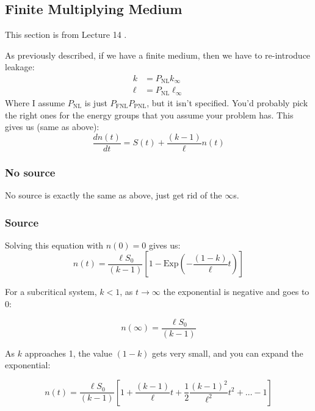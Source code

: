 \documentclass[letter]{article}
\begin{document}
\subsection{Finite Multiplying Medium}

This section is from Lecture 14 \cite{lecture}.

As previously described, if we have a finite medium, then we have to
re-introduce leakage:
\begin{equation*}
  \begin{split}
    k&=P_{\text{NL}}k_\infty \\
    \ell &= P_{\text{NL}}\ell_\infty
  \end{split}
\end{equation*}
Where I assume $P_{\text{NL}}$ is just $P_{\text{FNL}}P_{\text{PNL}}$,
but it isn't specified. You'd probably pick the right ones for the
energy groups that you assume your problem has. This gives us (same as
above):
\begin{equation*}
      \frac{dn(t)}{dt}=S(t)+\frac{(k-1)}{\ell}n(t)
\end{equation*}

\subsubsection{No source}

No source is exactly the same as above, just get rid of the $\infty$s.

\subsubsection{Source}

Solving this equation with $n(0)=0$ gives us:
\begin{equation*}
  n(t)=\frac{\ell S_0}{(k-1)}\left[1-\text{Exp}\left(-\frac{(1-k)}{\ell}t\right)\right]
\end{equation*}

For a subcritical system, $k<1$, as $t\to\infty$ the exponential is
negative and goes to 0:

\begin{equation*}
  n(\infty)=\frac{\ell{}S_0}{(k-1)}
\end{equation*}

As $k$ approaches 1, the value $(1-k)$ gets very small, and you can
expand the exponential:

\begin{equation*}
  n(t)=\frac{\ell S_0}{(k-1)}\left[1+\frac{(k-1)}{\ell}t+\frac{1}{2}\frac{(k-1)^2}{\ell^2}t^2+\ldots-1\right]
\end{equation*}
\end{document}
